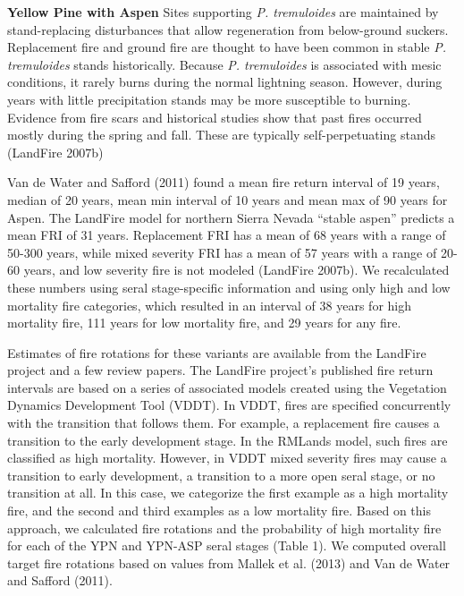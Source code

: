 \textbf{Yellow Pine with Aspen}	Sites supporting \emph{P. tremuloides} are maintained by stand-replacing disturbances that allow regeneration from below-ground suckers. Replacement fire and ground fire are thought to have been common in stable \emph{P. tremuloides} stands historically. Because \emph{P. tremuloides} is associated with mesic conditions, it rarely burns during the normal lightning season. However, during years with little precipitation stands may be more susceptible to burning. Evidence from fire scars and historical studies show that past fires occurred mostly during the spring and fall. These are typically self-perpetuating stands (LandFire 2007b)

Van de Water and Safford (2011) found a mean fire return interval of 19 years, median of 20 years, mean min interval of 10 years and mean max of 90 years for Aspen. The LandFire model for northern Sierra Nevada ``stable aspen'' predicts a mean FRI of 31 years. Replacement FRI has a mean of 68 years with a range of 50-300 years, while mixed severity FRI has a mean of 57 years with a range of 20-60 years, and low severity fire is not modeled (LandFire 2007b). We recalculated these numbers using seral stage-specific information and using only high and low mortality fire categories, which resulted in an interval of 38 years for high mortality fire, 111 years for low mortality fire, and 29 years for any fire.

Estimates of fire rotations for these variants are available from the LandFire project and a few review papers. The LandFire project’s published fire return intervals are based on a series of associated models created using the Vegetation Dynamics Development Tool (VDDT). In VDDT, fires are specified concurrently with the transition that follows them. For example, a replacement fire causes a transition to the early development stage. In the RMLands model, such fires are classified as high mortality. However, in VDDT mixed severity fires may cause a transition to early development, a transition to a more open seral stage, or no transition at all. In this case, we categorize the first example as a high mortality fire, and the second and third examples as a low mortality fire. Based on this approach, we calculated fire rotations and the probability of high mortality fire for each of the YPN and YPN-ASP seral stages (Table 1). We computed overall target fire rotations based on values from Mallek et al. (2013) and Van de Water and Safford (2011). 





